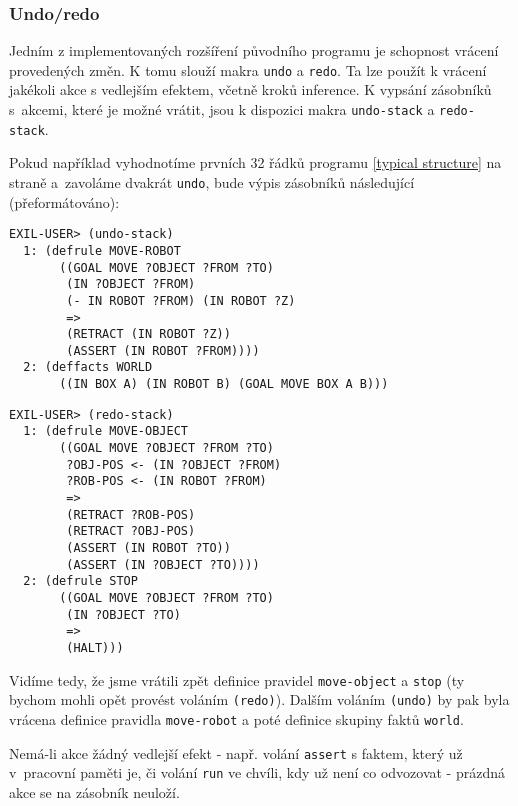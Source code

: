\subsubsection{Undo/redo}

Jedním z implementovaných rozšíření původního programu je schopnost vrácení
provedených změn. K tomu slouží makra \verb|undo| a \verb|redo|. Ta lze použít k
vrácení jakékoli akce s vedlejším efektem, včetně kroků inference. K vypsání
zásobníků s~akcemi, které je možné vrátit, jsou k dispozici makra
\verb|undo-stack| a \verb|redo-stack|.

Pokud například vyhodnotíme prvních 32 řádků programu \ref{typical structure} na
straně \pageref{typical structure} a~zavoláme dvakrát \verb|undo|, bude výpis
zásobníků následující (přeformátováno):
\begin{verbatim}
EXIL-USER> (undo-stack)
  1: (defrule MOVE-ROBOT
       ((GOAL MOVE ?OBJECT ?FROM ?TO)
        (IN ?OBJECT ?FROM)
        (- IN ROBOT ?FROM) (IN ROBOT ?Z)
        =>
        (RETRACT (IN ROBOT ?Z))
        (ASSERT (IN ROBOT ?FROM))))
  2: (deffacts WORLD
       ((IN BOX A) (IN ROBOT B) (GOAL MOVE BOX A B)))
\end{verbatim}
\begin{verbatim}
EXIL-USER> (redo-stack)
  1: (defrule MOVE-OBJECT
       ((GOAL MOVE ?OBJECT ?FROM ?TO)
        ?OBJ-POS <- (IN ?OBJECT ?FROM)
        ?ROB-POS <- (IN ROBOT ?FROM)
        =>
        (RETRACT ?ROB-POS)
        (RETRACT ?OBJ-POS)
        (ASSERT (IN ROBOT ?TO))
        (ASSERT (IN ?OBJECT ?TO))))
  2: (defrule STOP
       ((GOAL MOVE ?OBJECT ?FROM ?TO)
        (IN ?OBJECT ?TO)
        =>
        (HALT)))
\end{verbatim}
Vidíme tedy, že jsme vrátili zpět definice pravidel \verb|move-object| a
\verb|stop| (ty bychom mohli opět provést voláním \verb|(redo)|). Dalším voláním
\verb|(undo)| by pak byla vrácena definice pravidla \verb|move-robot| a poté
definice skupiny faktů \verb|world|.

Nemá-li akce žádný vedlejší efekt - např. volání \verb|assert| s faktem, který
už v~pracovní paměti je, či volání \verb|run| ve chvíli, kdy už není co
odvozovat - prázdná akce se na zásobník neuloží.
